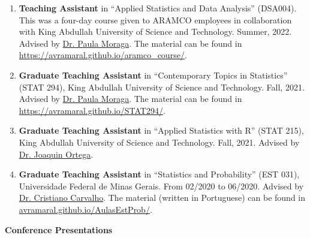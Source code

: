 \documentclass[11pt, ]{article}
\begin{document}
	\begin{enumerate}
		\item \textbf{Teaching Assistant} in ``Applied Statistics and Data Analysis'' (DSA004). This was a four-day course given to ARAMCO employees in collaboration with King Abdullah University of Science and Technology. Summer, 2022. Advised by \href{https://www.paulamoraga.com/}{Dr. Paula Moraga}. The material can be found in \href{https://avramaral.github.io/aramco\_course/}{https://avramaral.github.io/aramco\_course/}.
		
		\item \textbf{Graduate Teaching Assistant} in ``Contemporary Topics in Statistics'' (STAT 294), King Abdullah University of Science and Technology. Fall, 2021. Advised by \href{https://www.paulamoraga.com/}{Dr. Paula Moraga}. The material can be found in \href{https://avramaral.github.io/STAT294/}{https://avramaral.github.io/STAT294/}.
		
		\item \textbf{Graduate Teaching Assistant} in ``Applied Statistics with R'' (STAT 215), King Abdullah University of Science and Technology. Fall, 2021. Advised by \href{https://cemse.kaust.edu.sa/people/person/joaquin-ortega-sanchez}{Dr. Joaquin Ortega}.
		
		\item \textbf{Graduate Teaching Assistant} in ``Statistics and Probability'' (EST 031), Universidade Federal de Minas Gerais. From 02/2020 to 06/2020. Advised by \href{http://www.est.ufmg.br/~cristianocs/}{Dr. Cristiano Carvalho}. The material (written in Portuguese) can be found in \href{https://avramaral.github.io/AulasEstProb/}{avramaral.github.io/AulasEstProb/}.
	\end{enumerate}

\vspace{6pt}

%
%

%
%

{\Large \textbf{Conference Presentations}}
\end{document}
